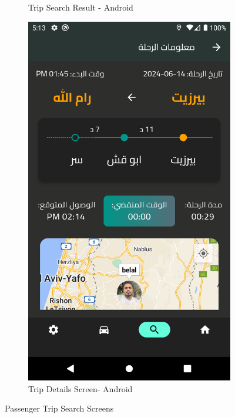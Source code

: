 \documentclass[a4paper, 12pt]{report} %
\begin{document}
\begin{figure}[H]
\begin{subfigure}{0.31\textwidth}
                    \caption{Trip Search Result - Android}
                    \label{fig:trip_search_4}
                \end{subfigure}
                \begin{subfigure}{0.31\textwidth}
                    \includegraphics[width=\linewidth]{Images/trip_Detail_screen.png}
                    \caption{Trip Details Screen- Android}
                    \label{fig:trip_details_1}
                \end{subfigure}
                \caption{Passenger Trip Search Screens}
                \label{fig:trip_search}
            \end{figure}
        \pagebreak
\end{document}
